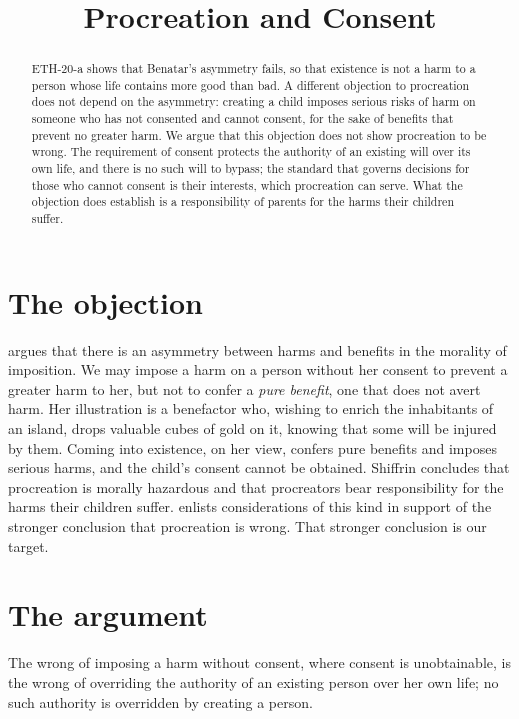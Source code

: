 \documentclass{situationist-preprint}
\title{Procreation and Consent}
\begin{document}
\maketitle

\begin{abstract}
ETH-20-a shows that Benatar's asymmetry fails, so that existence is not a harm to a person whose life contains more good than bad. A different objection to procreation does not depend on the asymmetry: creating a child imposes serious risks of harm on someone who has not consented and cannot consent, for the sake of benefits that prevent no greater harm. We argue that this objection does not show procreation to be wrong. The requirement of consent protects the authority of an existing will over its own life, and there is no such will to bypass; the standard that governs decisions for those who cannot consent is their interests, which procreation can serve. What the objection does establish is a responsibility of parents for the harms their children suffer.
\end{abstract}

\section{The objection}

\citet{Shiffrin1999} argues that there is an asymmetry between harms and benefits in the morality of imposition. We may impose a harm on a person without her consent to prevent a greater harm to her, but not to confer a \emph{pure benefit}, one that does not avert harm. Her illustration is a benefactor who, wishing to enrich the inhabitants of an island, drops valuable cubes of gold on it, knowing that some will be injured by them. Coming into existence, on her view, confers pure benefits and imposes serious harms, and the child's consent cannot be obtained. Shiffrin concludes that procreation is morally hazardous and that procreators bear responsibility for the harms their children suffer. \citet{Benatar2006} enlists considerations of this kind in support of the stronger conclusion that procreation is wrong. That stronger conclusion is our target.

\section{The argument}

\begin{proposition}\label{p:noauthority}
The wrong of imposing a harm without consent, where consent is unobtainable, is the wrong of overriding the authority of an existing person over her own life; no such authority is overridden by creating a person.
\end{proposition}
\end{document}
